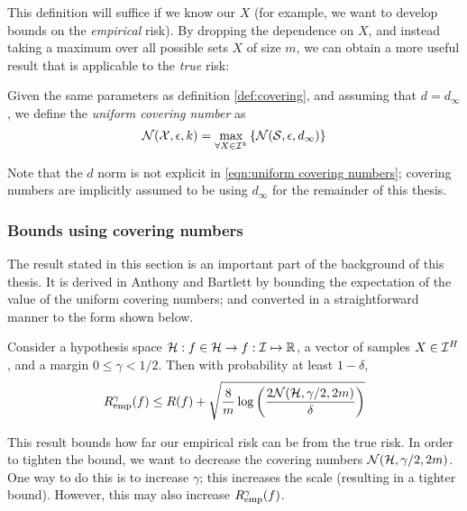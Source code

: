This definition will suffice if we know our $X$ (for example, we want
to develop bounds on the \emph{empirical} risk).  By dropping the dependence
on $X$, and instead taking a maximum over all possible sets $X$
of size $m$, we can obtain a more useful result that is applicable to the
\emph{true} risk:

\begin{definition}
Given the same parameters as definition \ref{def:covering}, and
assuming that $d = d_{\infty}$, we define
the \emph{uniform covering number} as
\begin{equation}
\label{eqn:uniform covering numbers}
\mathcal{N}({\mathcal{X}}, {\epsilon}, {k}) = \max_{\forall X \in \mathcal{I}^k} \left\{
\mathcal{N}({\mathcal{S}}, {\epsilon}, {d_{\infty}}) \right\} 
\end{equation}
\end{definition}

Note that the $d$ norm is not explicit in \ref{eqn:uniform covering
numbers}; covering numbers are implicitly assumed to be using
$d_{\infty}$ for the remainder of this thesis.

\subsubsection{Bounds using covering numbers}
\label{sec:covering number bounds}

The result stated in this section is an important part of the
background of this thesis.  It is derived in Anthony and Bartlett
\cite{Anthony98} by bounding the expectation of the value of the
uniform covering numbers; and converted in a straightforward manner to
the form shown below.

\begin{theorem}
Consider a hypothesis space $\mathcal{H} : f \in \mathcal{H} \rightarrow f : \mathcal{I}
\mapsto \mathbb{R}$, a vector of samples $X \in \mathcal{I}^H$, and a margin
$0 \leq \gamma < 1/2$.  Then with probability at least $1 - \delta$, 
\begin{equation}
R_{\mathrm{emp}}^{\gamma}(f) \leq R(f) + \sqrt{\frac{8}{m} \log \left( \frac{2
\mathcal{N}({\mathcal{H}}, {\gamma/2}, {2m})}{\delta} \right)}
\label{eqn:covering number bound}
\end{equation}
\end{theorem}

This result bounds how far our empirical risk can be from the true
risk.  In order to tighten the bound, we want to decrease the covering
numbers $\mathcal{N}({\mathcal{H}}, {\gamma/2}, {2m})$.  One way to do this is to
increase  $\gamma$; this increases the scale (resulting in a tighter
bound).  However, this may also increase $R_{\mathrm{emp}}^{\gamma}(f)$.


